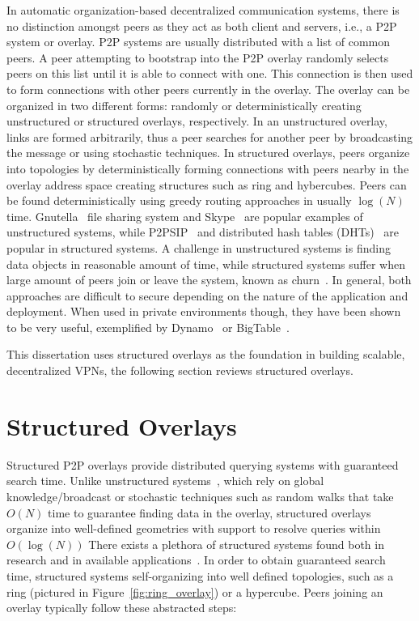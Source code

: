 In automatic organization-based decentralized communication systems, there is
no distinction amongst peers as they act as both client and servers, i.e., a
P2P system or overlay.  P2P systems are usually distributed with a list of
common peers.  A peer attempting to bootstrap into the P2P overlay randomly
selects peers on this list until it is able to connect with one.  This
connection is then used to form connections with other peers currently in the
overlay.  The overlay can be organized in two different forms: randomly or
deterministically creating unstructured or structured overlays, respectively.
In an unstructured overlay, links are formed arbitrarily, thus a peer searches
for another peer by broadcasting the message or using stochastic techniques.
In structured overlays, peers organize into topologies by deterministically
forming connections with peers nearby in the overlay address space creating
structures such as ring and hybercubes.  Peers can be found deterministically
using greedy routing approaches in usually $\log(N)$ time.
Gnutella~\cite{gnutella} file sharing system and Skype~\cite{skype} are popular
examples of unstructured systems, while P2PSIP~\cite{p2psip} and distributed
hash tables (DHTs)~\cite{chord} are popular in structured systems.  A challenge
in unstructured systems is finding data objects in reasonable amount of time,
while structured systems suffer when large amount of peers join or leave the
system, known as churn~\cite{opendht}.  In general, both approaches are
difficult to secure depending on the nature of the application and deployment.
When used in private environments though, they have been shown to be very
useful, exemplified by Dynamo~\cite{dynamo} or BigTable~\cite{bigtable}.

This dissertation uses structured overlays as the foundation in building
scalable, decentralized VPNs, the following section reviews structured
overlays.

\section{Structured Overlays}

Structured P2P overlays provide distributed querying systems with guaranteed
search time.  Unlike unstructured systems~\cite{unstructured_v_structured},
which rely on global knowledge/broadcast or stochastic techniques such as
random walks that take $O(N)$ time to guarantee finding data in the overlay,
structured overlays organize into well-defined geometries with support to
resolve queries within $O(\log(N))$ There exists a plethora of structured
systems found both in research and in available applications~\cite{pastry,
chord, symphony, kademlia, can, brunet}.  In order to obtain guaranteed search
time, structured systems self-organizing into well defined topologies, such as
a ring (pictured in Figure~\ref{fig:ring_overlay}) or a hypercube.  Peers
joining an overlay typically follow these abstracted steps:

